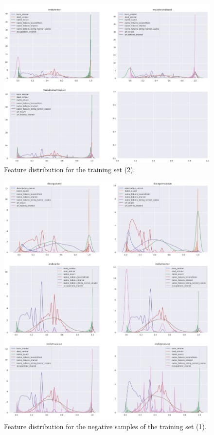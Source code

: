 \documentclass[epsfig,a4paper,11pt,titlepage,twoside,openany]{book}
\begin{document}
\begin{figure}[H]
      \centering
      \includegraphics[width=\linewidth]{training_feature_distribution_2}
      \caption{Feature distribution for the training set (2).}
      \label{fig:distribution-of-training-features-2}
\end{figure}



\begin{figure}[H]
      \centering
      \includegraphics[width=\linewidth]{features_distribution_negative_samples_1}
      \caption{Feature distribution for the negative samples of the training set (1).}
      \label{fig:distribution-of-training-negative-features-1}
\end{figure}
\end{document}
